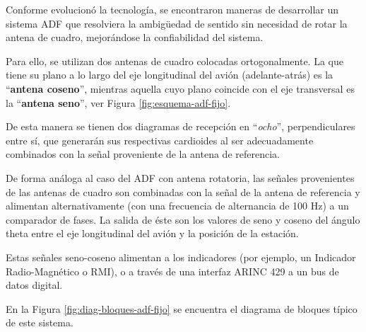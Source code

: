 Conforme evolucion\'o la tecnolog\'ia, se encontraron maneras de desarrollar un sistema ADF que resolviera la ambigüedad de sentido sin necesidad de rotar la antena de cuadro, mejor\'andose la confiabilidad del sistema.

Para ello, se utilizan dos antenas de cuadro colocadas ortogonalmente. La que tiene su plano a lo largo del eje longitudinal del avi\'on (adelante-atr\'as) es la ``\textbf{antena coseno}'', mientras aquella cuyo plano coincide con el eje transversal es la ``\textbf{antena seno}'', ver Figura \ref{fig:esquema-adf-fijo}.

De esta manera se tienen dos diagramas de recepci\'on en ``\emph{ocho}'', perpendiculares entre s\'i, que generar\'an sus respectivas cardioides al ser adecuadamente combinados con la se\~nal proveniente de la antena de referencia.%



De forma an\'aloga al caso del ADF con antena rotatoria, las se\~nales provenientes de las antenas de cuadro son combinadas con la se\~nal de la antena de referencia y alimentan alternativamente (con una frecuencia de alternancia de 100 Hz) a un comparador de fases. La salida de \'este son los valores de seno y coseno del \'angulo theta entre el eje longitudinal del avi\'on y la posici\'on de la estaci\'on.

Estas se\~nales seno-coseno alimentan a los indicadores (por ejemplo, un Indicador Radio-Magn\'etico o RMI), o a trav\'es de una interfaz ARINC 429 a un bus de datos digital.

En la Figura \ref{fig:diag-bloques-adf-fijo} se encuentra el diagrama de bloques t\'ipico de este sistema.

